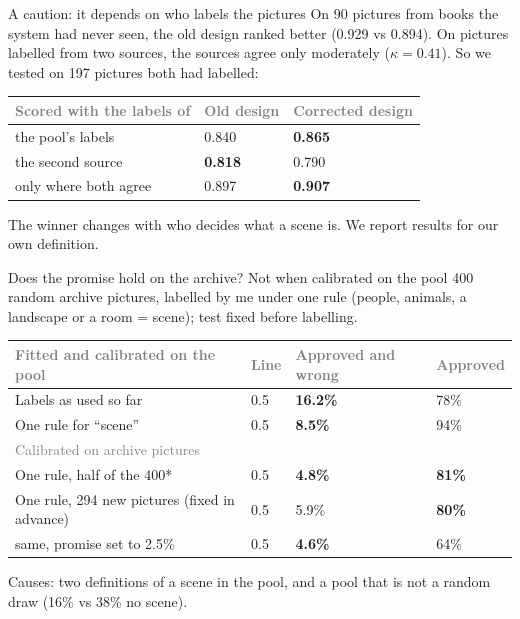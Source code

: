 \documentclass[aspectratio=169,11pt]{beamer}
\renewcommand{\arraystretch}{1.3}
\newcommand{\yes}[1]{\textcolor{accent}{\textbf{#1}}}
\newcommand{\no}[1]{\textcolor{warn}{\textbf{#1}}}
\newcommand{\h}[1]{\textcolor{grey}{#1}}
\newcommand{\remark}[1]{\par\vspace{0.35cm}{\small\textcolor{grey}{#1}}}
\begin{document}
\begin{frame}{A caution: it depends on who labels the pictures}
On 90 pictures from books the system had never seen, the old design ranked better (0.929 vs 0.894). On pictures labelled from two sources, the sources agree only moderately ($\kappa = 0.41$). So we tested on 197 pictures both had labelled:

\vspace{0.3cm}
\begin{tabular}{@{}L{6cm} C{3cm} C{3cm}@{}}
\toprule
\h{Scored with the labels of} & \h{Old design} & \h{Corrected design}\\
\midrule
the pool's labels & 0.840 & \textbf{0.865}\\
the second source & \textbf{0.818} & 0.790\\
only where both agree & 0.897 & \textbf{0.907}\\
\bottomrule
\end{tabular}

\vspace{0.3cm}
The winner changes with who decides what a scene is. We report results for our own definition.
\end{frame}

\begin{frame}{Does the promise hold on the archive? Not when calibrated on the pool}
\footnotesize 400 random archive pictures, labelled by me under one rule (people, animals, a landscape or a room = scene); test fixed before labelling.

\vspace{0.05cm}
\renewcommand{\arraystretch}{1.05}\begin{tabular}{@{}L{4.4cm} C{2.0cm} C{3.0cm} C{2.0cm}@{}}
\toprule
\h{Fitted and calibrated on the pool} & \h{Line} & \h{Approved and wrong} & \h{Approved}\\
\midrule
Labels as used so far & 0.5 & \no{16.2\%} & 78\%\\
One rule for ``scene'' & 0.5 & \no{8.5\%} & 94\%\\
\midrule
\h{Calibrated on archive pictures} & & & \\
One rule, half of the 400* & 0.5 & \yes{4.8\%} & \textbf{81\%}\\
One rule, 294 new pictures (fixed in advance) & 0.5 & 5.9\% & \textbf{80\%}\\
\quad same, promise set to 2.5\% & 0.5 & \no{4.6\%} & 64\%\\
\bottomrule
\end{tabular}

\vspace{0.02cm}
Causes: two definitions of a scene in the pool, and a pool that is not a random draw (16\% vs 38\% no scene).
\remark{* Added after the first test. New pictures: both promises narrowly missed; the two samples differ (38\% vs 47\% no scene): labels moved?}
\end{frame}
\end{document}
